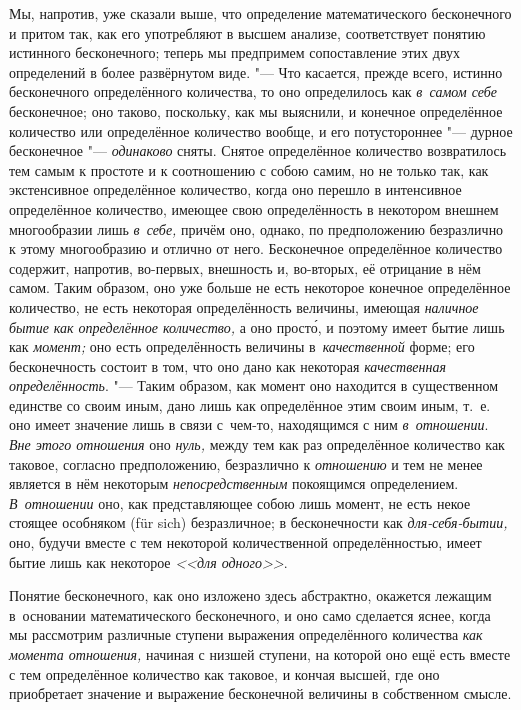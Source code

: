 Мы, напротив, уже сказали выше, что определение математического бесконечного и
притом так, как его употребляют в высшем анализе, соответствует понятию
истинного бесконечного; теперь мы предпримем сопоставление этих двух
определений в более развёрнутом виде. "--- Что касается, прежде всего, истинно
бесконечного определённого количества, то оно определилось как {\em в~самом
себе} бесконечное; оно таково, поскольку, как мы выяснили, и конечное
определённое количество или определённое количество вообще, и его потустороннее
"--- дурное бесконечное "--- {\em одинаково} сняты. Снятое определённое количество
возвратилось тем самым к простоте и к соотношению с собою самим, но не только
так, как экстенсивное определённое количество, когда оно перешло в интенсивное
определённое количество, имеющее свою определённость в некотором внешнем
многообразии лишь {\em в~себе,} причём оно, однако, по предположению
безразлично к этому многообразию и отлично от него. Бесконечное определённое
количество содержит, напротив, во-первых, внешность и, во-вторых, её отрицание
в нём самом. Таким образом, оно уже больше не есть некоторое конечное
определённое количество, не есть некоторая определённость величины, имеющая
{\em наличное бытие как определённое количество,} а оно прост\'{о}, и поэтому имеет
бытие лишь как {\em момент;} оно есть определённость величины
в~{\em качественной} форме; его бесконечность состоит в том, что оно дано как
некоторая {\em качественная определённость}. "--- Таким образом, как момент оно
находится в существенном единстве со своим иным, дано лишь как
определённое этим своим иным, т.~е. оно имеет значение лишь в связи
с~чем-то, находящимся с ним {\em в~отношении}. {\em Вне этого отношения} оно
{\em нуль,} между тем как раз определённое количество как таковое, согласно
предположению, безразлично к {\em отношению} и тем не менее является в нём
некоторым {\em непосредственным} покоящимся определением. {\em В~отношении}
оно, как представляющее собою лишь момент, не есть некое стоящее особняком
(für sich) безразличное; в бесконечности как {\em для-себя-бытии,} оно, будучи
вместе с тем некоторой количественной определённостью, имеет бытие лишь как
некоторое {\em <<для одного>>}.

Понятие бесконечного, как оно изложено здесь абстрактно, окажется лежащим
в~основании математического бесконечного, и оно само сделается яснее, когда
мы рассмотрим различные ступени выражения определённого количества
{\em как момента отношения,} начиная с низшей ступени, на которой оно ещё есть
вместе с тем определённое количество как таковое, и кончая высшей, где оно
приобретает значение и выражение бесконечной величины в собственном смысле.

